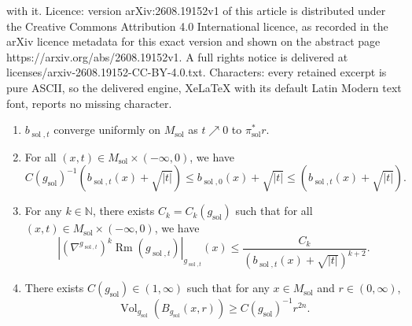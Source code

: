 \documentclass[10pt,a4paper]{amsart}
\newcommand{\Rm}{\operatorname{Rm}}
\providecommand{\sol}{\operatorname{sol}}
\begin{document}
with it. Licence: version arXiv:2608.19152v1 of this article is distributed under the Creative Commons Attribution 4.0 International licence, as recorded in the arXiv licence metadata for this exact version and shown on the abstract page https://arxiv.org/abs/2608.19152v1. A full rights notice is delivered at licenses/arxiv-2608.19152-CC-BY-4.0.txt. Characters: every retained excerpt is pure ASCII, so the delivered engine, XeLaTeX with its default Latin Modern text font, reports no missing character.
\begin{lemma} \label{lem:basicACfacts}
    \begin{enumerate}
        \item \label{lem:basicACfacts1} $b_{\sol,t}$ converge uniformly on $M_{\sol}$ as $t\nearrow 0$ to $\pi_{\sol}^{\ast}r$.

        \item \label{lem:basicACfacts2} For all $(x,t)\in M_{\sol} \times (-\infty,0)$, we have
        \begin{equation*}
            C(g_{\sol})^{-1}(b_{\sol,t}(x)+\sqrt{|t|})\leq b_{\sol,0}(x)+\sqrt{|t|} \leq (b_{\sol,t}(x)+\sqrt{|t|}).
        \end{equation*}

        \item \label{lem:basicACfacts3} For any $k\in \mathbb{N}$, there exists $C_k =C_k(g_{\sol})$ such that for all $(x,t)\in M_{\sol}\times (-\infty,0)$, we have
        \begin{equation*}
            |(\nabla^{g_{\sol,t}})^k\Rm(g_{\sol,t})|_{g_{\sol,t}}(x) \leq \frac{C_k}{(b_{\sol,t}(x)+\sqrt{|t|})^{k+2}}.
        \end{equation*}

        \item \label{lem:basicACfacts4}
        There exists $C(g_{\sol}) \in (1,\infty)$ such that for any $x\in M_{\sol}$ and $r\in (0,\infty)$,
        \begin{equation*}
            \operatorname{Vol}_{g_{\sol}}(B_{g_{\sol}}(x,r))\geq C(g_{\sol})^{-1}r^{2n}.
        \end{equation*}
    \end{enumerate}
\end{lemma}
\end{document}
